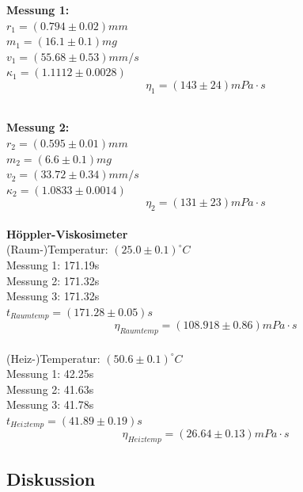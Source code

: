 \documentclass[12pt,a4paper]{article}
\begin{document}
\begin{multicols}{2}
\noindent



\textbf{Messung 1:}\\
$r_1 = (0.794 \pm 0.02) mm$\\
$m_1 = (16.1 \pm 0.1) mg$\\
$v_1 = (55.68 \pm 0.53)mm/s$\\
$\kappa_1 =  %
(1.1112\pm 0.0028)$\\


$$\eta_1 = %
(143 \pm 24) mPa \cdot s$$
\\
\noindent



\textbf{Messung 2:}\\
$r_2=(0.595 \pm 0.01)mm$\\
$m_2=(6.6 \pm 0.1)mg$\\
$v_2 = (33.72 \pm 0.34) mm/s$\\
$\kappa_2 = %
(1.0833 \pm 0.0014)$\\

$$\eta_2 = %
(131\pm 23) mPa\cdot s$$\\




\noindent
\textbf{Höppler-Viskosimeter}\\
(Raum-)Temperatur: $(25.0 \pm 0.1)^{\circ}C$\\
Messung 1: 171.19s\\
Messung 2: 171.32s\\
Messung 3: 171.32s\\
$t_{Raumtemp}= (171.28 \pm 0.05)s$\\
$$\eta_{Raumtemp}= (108.918\pm 0.86)mPa\cdot s$$
\\
(Heiz-)Temperatur: $(50.6\pm 0.1)^{\circ}C$\\
Messung 1: 42.25s\\
Messung 2: 41.63s\\
Messung 3: 41.78s\\
$t_{Heiztemp}= (41.89 \pm 0.19)s$\\
$$\eta_{Heiztemp}=(26.64\pm 0.13)mPa\cdot s$$

\subsection{Diskussion}



\end{multicols}
\end{document}
